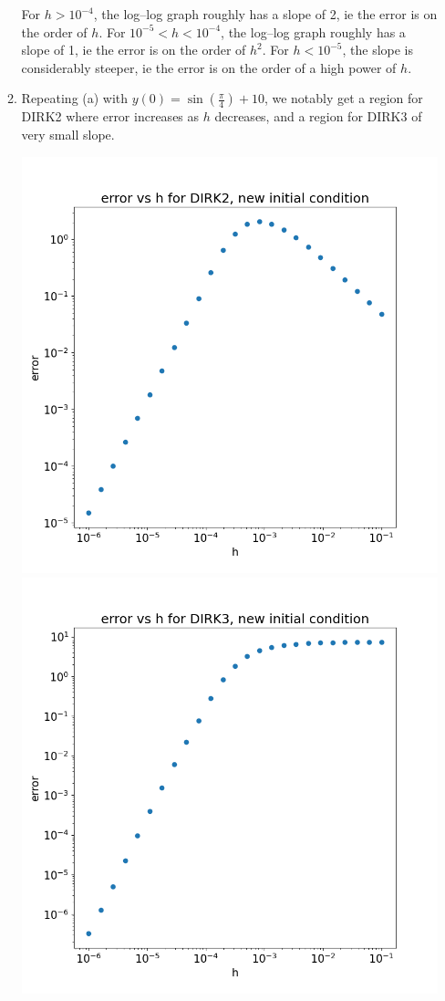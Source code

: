 \documentclass{article}
\begin{document}
\begin{enumerate}
\begin{enumerate}[label=(\alph*)]
	For $h>10^{-4}$, the log--log graph roughly has a slope of 2, ie the error is on the order of $h$. For $10^{-5}<h<10^{-4}$, the log--log graph roughly has a slope of 1, ie the error is on the order of $h^2$. For $h<10^{-5}$, the slope is considerably steeper, ie the error is on the order of a high power of $h$.
	
	
	\item Repeating (a) with $y(0)=\sin(\frac\pi4)+10$, we notably get a region for DIRK2 where error increases as $h$ decreases, and a region for DIRK3 of very small slope.
	
	\begin{center}
		\includegraphics[scale=.3]{hw3 dirk2 err new ic}
		\includegraphics[scale=.3]{hw3 dirk3 err new ic}
	\end{center}
	

\end{enumerate}
\end{enumerate}
\end{document}
